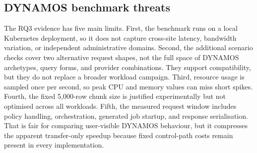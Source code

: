 \subsection{DYNAMOS benchmark threats}

The RQ3 evidence has five main limits. First, the benchmark runs on a local Kubernetes deployment, so it does not capture cross-site latency, bandwidth variation, or independent administrative domains. Second, the additional scenario checks cover two alternative request shapes, not the full space of DYNAMOS archetypes, query forms, and provider combinations. They support compatibility, but they do not replace a broader workload campaign. Third, resource usage is sampled once per second, so peak CPU and memory values can miss short spikes. Fourth, the fixed 5{,}000-row chunk size is justified experimentally but not optimised across all workloads. Fifth, the measured request window includes policy handling, orchestration, generated job startup, and response serialisation. That is fair for comparing user-visible DYNAMOS behaviour, but it compresses the apparent transfer-only speedup because fixed control-path costs remain present in every implementation.
